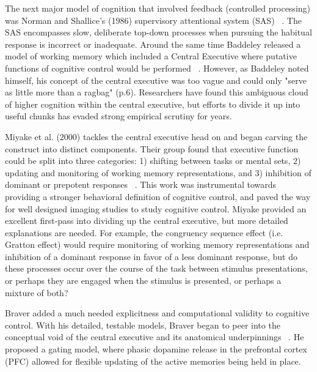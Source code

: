 \documentclass[phd,appendix,figures]{uithesis}
\begin{document}
The next major model of cognition that involved feedback (controlled processing) was Norman and Shallice's (1986) supervisory attentional system (SAS) ~\citep{Norman1986}. 
The SAS encompasses slow, deliberate top-down processes when pursuing the habitual response is incorrect or inadequate.
Around the same time Baddeley released a model of working memory which included a Central Executive where putative functions of cognitive control would be performed ~\citep{Baddeley1996}.
However, as Baddeley noted himself, his concept of the central executive was too vague and could only "serve as little more than a ragbag" (p.6). 
Researchers have found this ambiguous cloud of higher cognition within the central executive, but efforts to divide it up into useful chunks has evaded strong empirical scrutiny for years.

Miyake et al. (2000) tackles the central executive head on and began carving the construct into distinct components. 
Their group found that executive function could be split into three categories:
1) shifting between tasks or mental sets,
2) updating and monitoring of working memory representations, and
3) inhibition of dominant or prepotent responses ~\citep{Miyake2000}.
This work was instrumental towards providing a stronger behavioral definition of cognitive control, and paved the way for well designed imaging studies to study cognitive control.
Miyake provided an excellent first-pass into dividing up the central executive, but more detailed explanations are needed.
For example, the congruency sequence effect (i.e. Gratton effect) would require monitoring of working memory representations and inhibition of a dominant response in favor of a less dominant response, but do these processes occur over the course of the task between stimulus presentations, or perhaps they are engaged when the stimulus is presented, or perhaps a mixture of both?

Braver added a much needed explicitness and computational validity to cognitive control. With his detailed, testable models, Braver began to peer into the conceptual void of the central executive and its anatomical underpinnings ~\citep{Braver2001}. 
He proposed a gating model, where phasic dopamine release in the prefrontal cortex (PFC) allowed for flexible updating of the active memories being held in place.
\end{document}
